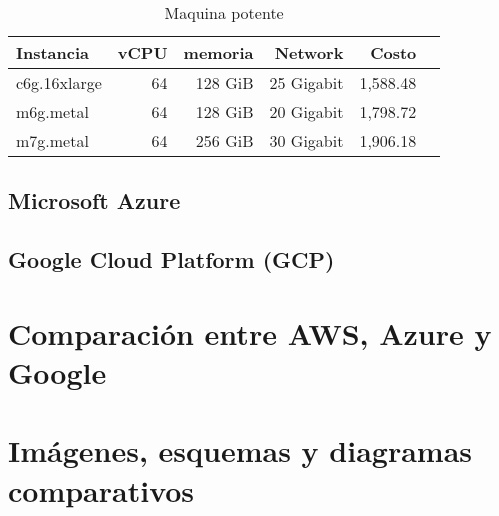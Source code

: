 \documentclass{article}
\begin{document}
\begin{table}[!htp]\centering
\caption{Maquina potente}\label{tab: }
\scriptsize
\begin{tabular}{lrrrrr}\toprule
Instancia &vCPU &memoria &Network &Costo \\\midrule
c6g.16xlarge &64 &128 GiB &25 Gigabit &1,588.48 \\
m6g.metal &64 &128 GiB &20 Gigabit &1,798.72 \\
m7g.metal &64 &256 GiB &30 Gigabit &1,906.18 \\
\bottomrule
\end{tabular}
\end{table}



  \subsection{Microsoft Azure}
  \subsection{Google Cloud Platform (GCP)}

\section{Comparación entre AWS, Azure y Google}

\section{Imágenes, esquemas y diagramas comparativos}


\printbibliography
\end{document}

